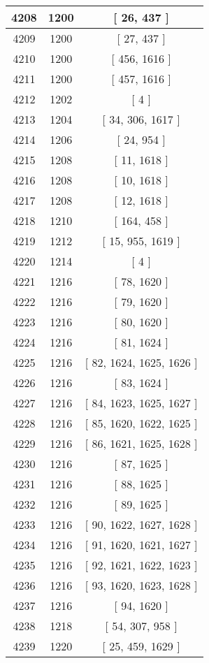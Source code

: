 \begin{center}
\begin{longtable}[H]{|| c c c ||}
\hline
4208 & 1200 & [ 26, 437 ] \\ 
\hline
4209 & 1200 & [ 27, 437 ] \\ 
\hline
4210 & 1200 & [ 456, 1616 ] \\ 
\hline
4211 & 1200 & [ 457, 1616 ] \\ 
\hline
4212 & 1202 & [ 4 ] \\ 
\hline
4213 & 1204 & [ 34, 306, 1617 ] \\ 
\hline
4214 & 1206 & [ 24, 954 ] \\ 
\hline
4215 & 1208 & [ 11, 1618 ] \\ 
\hline
4216 & 1208 & [ 10, 1618 ] \\ 
\hline
4217 & 1208 & [ 12, 1618 ] \\ 
\hline
4218 & 1210 & [ 164, 458 ] \\ 
\hline
4219 & 1212 & [ 15, 955, 1619 ] \\ 
\hline
4220 & 1214 & [ 4 ] \\ 
\hline
4221 & 1216 & [ 78, 1620 ] \\ 
\hline
4222 & 1216 & [ 79, 1620 ] \\ 
\hline
4223 & 1216 & [ 80, 1620 ] \\ 
\hline
4224 & 1216 & [ 81, 1624 ] \\ 
\hline
4225 & 1216 & [ 82, 1624, 1625, 1626 ] \\ 
\hline
4226 & 1216 & [ 83, 1624 ] \\ 
\hline
4227 & 1216 & [ 84, 1623, 1625, 1627 ] \\ 
\hline
4228 & 1216 & [ 85, 1620, 1622, 1625 ] \\ 
\hline
4229 & 1216 & [ 86, 1621, 1625, 1628 ] \\ 
\hline
4230 & 1216 & [ 87, 1625 ] \\ 
\hline
4231 & 1216 & [ 88, 1625 ] \\ 
\hline
4232 & 1216 & [ 89, 1625 ] \\ 
\hline
4233 & 1216 & [ 90, 1622, 1627, 1628 ] \\ 
\hline
4234 & 1216 & [ 91, 1620, 1621, 1627 ] \\ 
\hline
4235 & 1216 & [ 92, 1621, 1622, 1623 ] \\ 
\hline
4236 & 1216 & [ 93, 1620, 1623, 1628 ] \\ 
\hline
4237 & 1216 & [ 94, 1620 ] \\ 
\hline
4238 & 1218 & [ 54, 307, 958 ] \\ 
\hline
4239 & 1220 & [ 25, 459, 1629 ] \\ 
\hline

\end{longtable}
\end{center}
